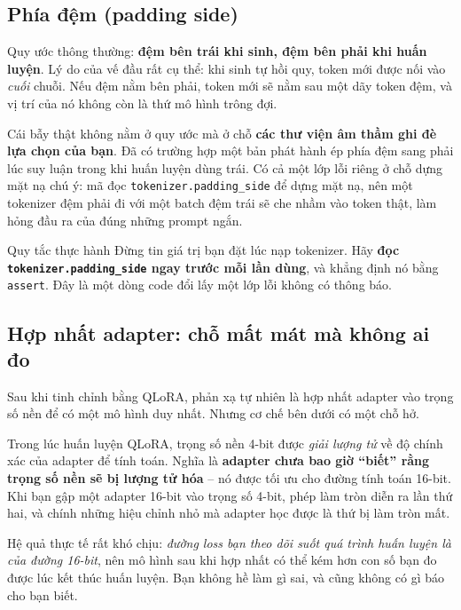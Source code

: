 \subsection{Phía đệm (padding side)}
\label{ssec:padding_side}

Quy ước thông thường: \textbf{đệm bên trái khi sinh, đệm bên phải khi huấn luyện}. Lý do của vế đầu rất cụ thể: khi sinh tự hồi quy, token mới được nối vào \emph{cuối} chuỗi. Nếu đệm nằm bên phải, token mới sẽ nằm sau một dãy token đệm, và vị trí của nó không còn là thứ mô hình trông đợi.

Cái bẫy thật không nằm ở quy ước mà ở chỗ \textbf{các thư viện âm thầm ghi đè lựa chọn của bạn}. Đã có trường hợp một bản phát hành ép phía đệm sang phải lúc suy luận trong khi huấn luyện dùng trái. Có cả một lớp lỗi riêng ở chỗ dựng mặt nạ chú ý: mã đọc \texttt{tokenizer.\allowbreak padding\_\allowbreak side} để dựng mặt nạ, nên một tokenizer đệm phải đi với một batch đệm trái sẽ che nhầm vào token thật, làm hỏng đầu ra của đúng những prompt ngắn.

\begin{pitfall}{Quy tắc thực hành}
Đừng tin giá trị bạn đặt lúc nạp tokenizer. Hãy \textbf{đọc \texttt{tokenizer.\allowbreak padding\_\allowbreak side} ngay trước mỗi lần dùng}, và khẳng định nó bằng \texttt{assert}. Đây là một dòng code đổi lấy một lớp lỗi không có thông báo.
\end{pitfall}

\subsection{Hợp nhất adapter: chỗ mất mát mà không ai đo}
\label{ssec:merge_adapter}

Sau khi tinh chỉnh bằng QLoRA, phản xạ tự nhiên là hợp nhất adapter vào trọng số nền để có một mô hình duy nhất. Nhưng cơ chế bên dưới có một chỗ hở.

Trong lúc huấn luyện QLoRA, trọng số nền 4-bit được \emph{giải lượng tử} về độ chính xác của adapter để tính toán. Nghĩa là \textbf{adapter chưa bao giờ “biết” rằng trọng số nền sẽ bị lượng tử hóa} -- nó được tối ưu cho đường tính toán 16-bit. Khi bạn gập một adapter 16-bit vào trọng số 4-bit, phép làm tròn diễn ra lần thứ hai, và chính những hiệu chỉnh nhỏ mà adapter học được là thứ bị làm tròn mất.

Hệ quả thực tế rất khó chịu: \emph{đường loss bạn theo dõi suốt quá trình huấn luyện là của đường 16-bit}, nên mô hình sau khi hợp nhất có thể kém hơn con số bạn đo được lúc kết thúc huấn luyện. Bạn không hề làm gì sai, và cũng không có gì báo cho bạn biết.

